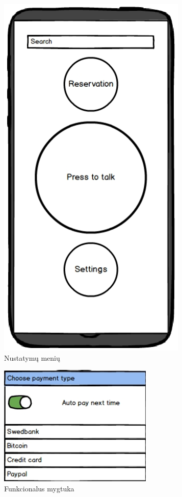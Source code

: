 \documentclass{VUMIFPSkursinis}
\begin{document}
\begin{figure}[H]
    \centering
    \includegraphics[scale=0.5]{img/vyt1}
	\caption{Nustatymų menių \label{fig:vyt1}}
\end{figure}

\begin{figure}[H]
    \centering
    \includegraphics[scale=0.5]{img/vyt2}
	\caption{Funkcionalus mygtuka \label{fig:vyt2}}
\end{figure}
\end{document}
